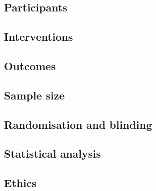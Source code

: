 \documentclass[11pt,a4paper]{article}
\begin{document}
\subsection{Participants}

\subsection{Interventions}

\subsection{Outcomes}

\subsection{Sample size}

\subsection{Randomisation and blinding}

\subsection{Statistical analysis}

\subsection{Ethics}
\end{document}
